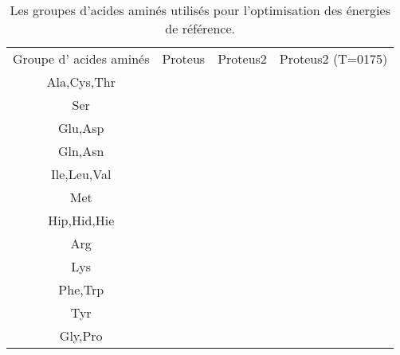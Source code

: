     \begin{table}[!htbp]
      \centering

      \begin{tabular}{cccc}

        \toprule
        Groupe d' acides aminés & Proteus & Proteus2 & Proteus2 (T=0175)\\
        \cmidrule{1-3}

         Ala,Cys,Thr & \\
         Ser         & \\
         Glu,Asp     & \\
         Gln,Asn     & \\
         Ile,Leu,Val & \\
         Met         & \\
         Hip,Hid,Hie & \\
         Arg         & \\
         Lys         & \\
         Phe,Trp     & \\
         Tyr         & \\
         Gly,Pro     & \\
        \bottomrule


      \end{tabular}      
      \caption{Les groupes d'acides aminés utilisés pour l'optimisation des énergies de référence.}
\label{tab:RefEner_groupes}      
    \end{table}



    \clearpage


